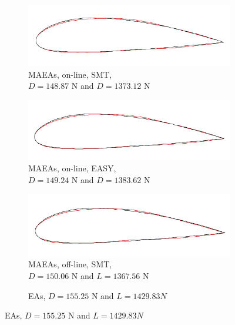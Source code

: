 \documentclass[twoside, 12pt,notitlepage]{report}
\begin{document}
\begin{enumerate}
\newpage


\begin{figure}[h!]
\centering
	\begin{subfigure}[b]{0.44\textwidth}
	\centering
	\caption{MAEAs, on-line, SMT, 
	\\  $D \!= \!148.87$ N and $D \!= \!1373.12$ N}
	\includegraphics[width=\textwidth, scale=1]{cruise_SMT} 
	\end{subfigure}
	\hfill
	\begin{subfigure}[b]{0.44\textwidth}
	\centering
	\caption{MAEAs, on-line, EASY, 
	\\ $D \!= \!149.24$ N and $D \!= \!1383.62$ N}
	\includegraphics[width=\textwidth, scale=1]{cruise_EASY}   
	\end{subfigure}
	\hfill
	\begin{subfigure}[b]{0.44\textwidth}
	\centering
	\caption{MAEAs, off-line, SMT, 
	\\ $D \!= \!150.06$ N and $L \!= \!1367.56$ N}
	\includegraphics[width=\textwidth, scale=1]{cruise_offline} 
	\end{subfigure}
	\hfill
	\begin{subfigure}[b]{0.44\textwidth}
	\centering
	\caption{EAs, $D \!= \!155.25$ N and $L \!= \!1429.83 N$}

\end{subfigure}
\end{figure}
\end{enumerate}
\end{document}
